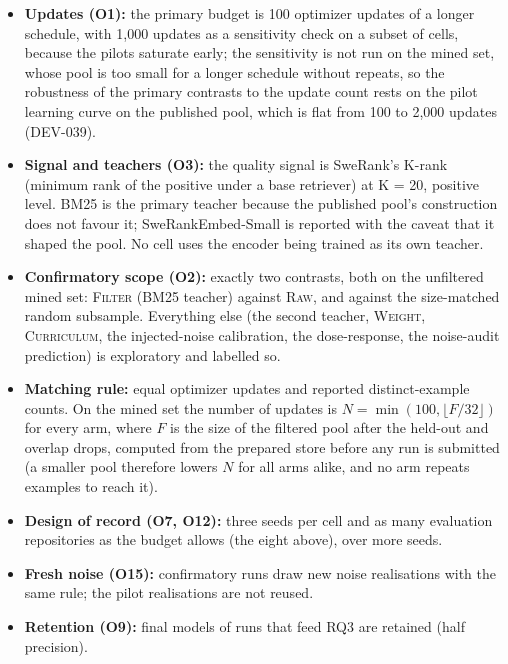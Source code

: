 \documentclass[10pt,twocolumn]{article}
\begin{document}
\begin{itemize}
  \item \textbf{Updates (O1):} the primary budget is 100 optimizer updates of a longer schedule, with
  1,000 updates as a sensitivity check on a subset of cells, because the pilots saturate early; the sensitivity is not run on the mined set, whose pool is too small for a longer schedule without repeats, so the robustness of the primary contrasts to the update count rests on the pilot learning curve on the published pool, which is flat from 100 to 2,000 updates (DEV-039). %
  \item \textbf{Signal and teachers (O3):} the quality signal is SweRank's K-rank (minimum rank of
  the positive under a base retriever) at K = 20, positive level. BM25 is the primary teacher because the
  published pool's construction does not favour it; SweRankEmbed-Small is reported with the caveat
  that it shaped the pool. No cell uses the encoder being trained as its own teacher. %
  \item \textbf{Confirmatory scope (O2):} exactly two contrasts, both on the unfiltered mined set:
  \textsc{Filter} (BM25 teacher) against \textsc{Raw}, and against the size-matched random
  subsample. Everything else (the second teacher, \textsc{Weight}, \textsc{Curriculum}, the injected-noise
  calibration, the dose-response, the noise-audit prediction) is exploratory and labelled so.
  \item \textbf{Matching rule:} equal optimizer updates and reported distinct-example counts. On the mined set the number of updates is $N=\min(100,\lfloor F/32\rfloor)$ for every arm, where $F$ is the size of the
  filtered pool after the held-out and overlap drops, computed from the prepared store before any run is submitted (a smaller pool therefore lowers $N$ for all arms alike, and no arm repeats examples to reach it). %
  \item \textbf{Design of record (O7, O12):} three seeds per cell and as many evaluation
  repositories as the budget allows (the eight above), over more seeds.
  \item \textbf{Fresh noise (O15):} confirmatory runs draw new noise realisations with the same
  rule; the pilot realisations are not reused.
  \item \textbf{Retention (O9):} final models of runs that feed RQ3 are retained (half precision).
\end{itemize}
\end{document}

